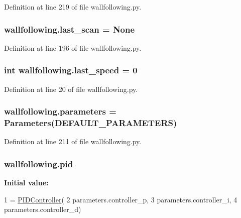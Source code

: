 Definition at line 219 of file wallfollowing.\+py.

\subsubsection[{\texorpdfstring{last\+\_\+scan}{last_scan}}]{\setlength{\rightskip}{0pt plus 5cm}wallfollowing.\+last\+\_\+scan = None}\hypertarget{namespacewallfollowing_ab6c7c8e53e8b1cd44872666515dd5764}{}\label{namespacewallfollowing_ab6c7c8e53e8b1cd44872666515dd5764}


Definition at line 196 of file wallfollowing.\+py.

\subsubsection[{\texorpdfstring{last\+\_\+speed}{last_speed}}]{\setlength{\rightskip}{0pt plus 5cm}int wallfollowing.\+last\+\_\+speed = 0}\hypertarget{namespacewallfollowing_a9ee8d77a4629b5d8ecb2899da6e3a7fe}{}\label{namespacewallfollowing_a9ee8d77a4629b5d8ecb2899da6e3a7fe}


Definition at line 20 of file wallfollowing.\+py.

\subsubsection[{\texorpdfstring{parameters}{parameters}}]{\setlength{\rightskip}{0pt plus 5cm}wallfollowing.\+parameters = {\bf Parameters}({\bf D\+E\+F\+A\+U\+L\+T\+\_\+\+P\+A\+R\+A\+M\+E\+T\+E\+RS})}\hypertarget{namespacewallfollowing_ae96254db0e391eed9862d0a6f636033e}{}\label{namespacewallfollowing_ae96254db0e391eed9862d0a6f636033e}


Definition at line 211 of file wallfollowing.\+py.

\subsubsection[{\texorpdfstring{pid}{pid}}]{\setlength{\rightskip}{0pt plus 5cm}wallfollowing.\+pid}\hypertarget{namespacewallfollowing_adc9f95e0b626be8ddae98a596a38e7e8}{}\label{namespacewallfollowing_adc9f95e0b626be8ddae98a596a38e7e8}
{\bfseries Initial value\+:}
\begin{DoxyCode}
1 = \hyperlink{classwallfollowing_1_1_p_i_d_controller}{PIDController}(
2     parameters.controller\_p,
3     parameters.controller\_i,
4     parameters.controller\_d)
\end{DoxyCode}


